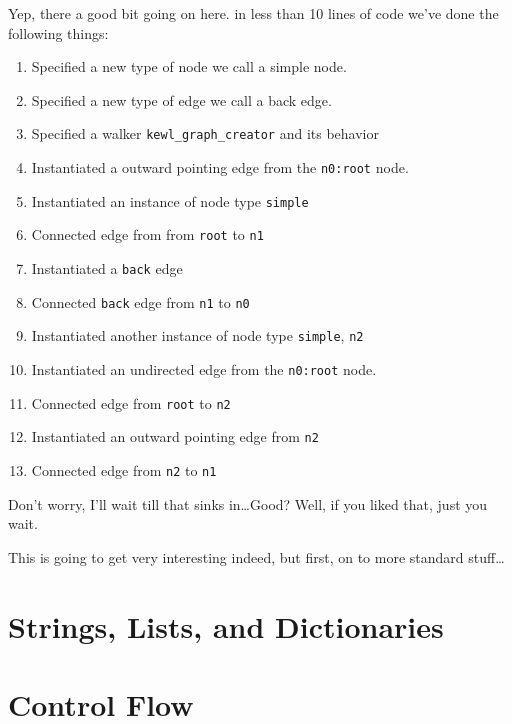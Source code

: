 Yep, there a good bit going on here. in less than 10 lines of code we've done the following things:
\begin{enumerate}[itemsep=0mm]
    \footnotesize
    \item Specified a new type of node we call a simple node.
    \item Specified a new type of edge we call a back edge.
    \item Specified a walker \texttt{kewl\_graph\_creator} and its behavior
    \item Instantiated a outward pointing edge from the \texttt{n0:root} node.
    \item Instantiated an instance of node type \texttt{simple}
    \item Connected edge from from \texttt{root} to \texttt{n1}
    \item Instantiated a \texttt{back} edge
    \item Connected \texttt{back} edge from \texttt{n1} to \texttt{n0}
    \item Instantiated another instance of node type \texttt{simple}, \texttt{n2}
    \item Instantiated an undirected edge from the \texttt{n0:root} node.
    \item Connected edge from \texttt{root} to \texttt{n2}
    \item Instantiated an outward pointing edge from \texttt{n2}
    \item Connected edge from \texttt{n2} to \texttt{n1}
\end{enumerate}

Don't worry, I'll wait till that sinks in\dots Good? Well, if you liked that, just you wait.
\par
This is going to get very interesting indeed, but first,  on to more standard stuff\dots


\section{Strings, Lists, and Dictionaries}

\section{Control Flow}

\par
{}
\par
{}

